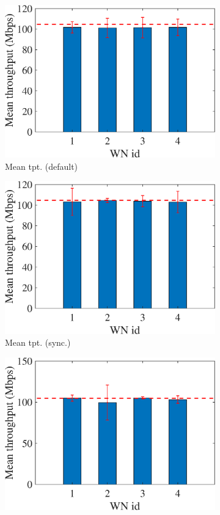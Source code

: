 \documentclass[preprint,12pt]{article}
\begin{document}
\begin{figure}[h!]
\begin{subfigure}[b]{.3\textwidth}
		\includegraphics[width=\textwidth]{images/mean_tpt_TS}
		\caption{Mean tpt. (default)}\label{fig:mean_tpt_TS}
	\end{subfigure}
	\begin{subfigure}[b]{.3\textwidth}
		\includegraphics[width=\textwidth]{images/mean_tpt_OTS}
		\caption{Mean tpt. (sync.)}\label{fig:mean_tpt_OTS}
	\end{subfigure}
	\begin{subfigure}[b]{.3\textwidth}
		\includegraphics[width=\textwidth]{images/mean_tpt_CTS}

\end{subfigure}
\end{figure}
\end{document}
